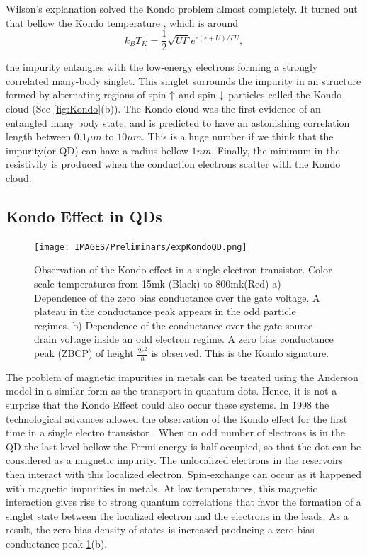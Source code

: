 Wilson's explanation solved the Kondo problem almost completely. It turned out that bellow the Kondo temperature \cite{sindel_numerical_2005}, which is around
\begin{equation}
k_BT_K = \frac{1}{2}\sqrt{U\Gamma}e^{\epsilon(\epsilon+U)/\Gamma U} ,
\end{equation}

\noindent the impurity entangles with the low-energy electrons forming a strongly correlated many-body singlet. This singlet surrounds the impurity in an structure formed by alternating regions of spin-$\uparrow$ and spin-$\downarrow$ particles called the Kondo cloud (See \ref{fig:Kondo}(b)). The Kondo cloud was the first evidence of an entangled many body state, and is predicted to have an astonishing correlation length between $0.1\mu m$ to $10 \mu m$. This is a huge number if we think that the impurity(or QD) can have a radius bellow $1nm$. Finally, the minimum in the resistivity is produced when the conduction electrons scatter with the Kondo cloud. 

\subsection{Kondo Effect in QDs}

\begin{figure}
  \centering
  \texttt{[image: IMAGES/Preliminars/expKondoQD.png]}
  \caption{ \label{fig:ExpKondo} Observation of the Kondo effect in a single electron transistor. Color scale temperatures from 15mk (Black) to 800mk(Red) a) Dependence of the zero bias conductance over the gate voltage. A plateau in the conductance peak appears in the odd particle regimes. b) Dependence of the conductance over the gate source drain voltage inside an odd electron regime. A zero bias conductance peak (ZBCP)  of height $\frac{2e^2}{\hbar}$ is observed. This is the Kondo signature.  \protect{}}
\end{figure}


  The problem of magnetic impurities in metals can be treated using the Anderson model in a similar form as the transport in quantum dots. Hence, it is not a surprise that the Kondo Effect could also occur these systems. In 1998 the technological advances allowed the observation of the Kondo effect for the first time in a single electro transistor \cite{goldhaber-gordon_kondo_1998}. When an odd number of electrons is in the QD the last level bellow the Fermi energy is half-occupied, so that the dot can be considered as a magnetic impurity. The unlocalized electrons in the reservoirs then interact with this localized electron. Spin-exchange can occur as it happened with  magnetic impurities in metals. At low temperatures, this magnetic  interaction gives rise to strong quantum correlations that favor the formation of a singlet state between the localized electron and the electrons in the leads. As a result, the zero-bias density of states is increased producing a zero-bias conductance peak \ref{fig:ExpKondo}(b). 

